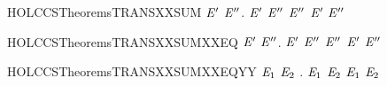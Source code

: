 \newcommand{\HOLCCSTheoremsTRANSXXstrongind}{\UseVerbatim{HOLCCSTheoremsTRANSXXstrongind}}
\begin{SaveVerbatim}{HOLCCSTheoremsTRANSXXSUM}
\HOLTokenTurnstile{} \HOLSymConst{\HOLTokenForall{}} \ensuremath{\HOLBoundVar{E}\sp{\prime}}  \ensuremath{\HOLBoundVar{E}\sp{\prime\prime}}.  \HOLSymConst{\ensuremath{+}} \ensuremath{\HOLBoundVar{E}\sp{\prime}} \HOLTokenTransBegin{}\HOLTokenTransEnd \ensuremath{\HOLBoundVar{E}\sp{\prime\prime}} \HOLSymConst{\HOLTokenImp{}}  \HOLTokenTransBegin{}\HOLTokenTransEnd \ensuremath{\HOLBoundVar{E}\sp{\prime\prime}} \HOLSymConst{\HOLTokenDisj{}} \ensuremath{\HOLBoundVar{E}\sp{\prime}} \HOLTokenTransBegin{}\HOLTokenTransEnd \ensuremath{\HOLBoundVar{E}\sp{\prime\prime}}
\end{SaveVerbatim}
\newcommand{\HOLCCSTheoremsTRANSXXSUM}{\UseVerbatim{HOLCCSTheoremsTRANSXXSUM}}
\begin{SaveVerbatim}{HOLCCSTheoremsTRANSXXSUMXXEQ}
\HOLTokenTurnstile{} \HOLSymConst{\HOLTokenForall{}} \ensuremath{\HOLBoundVar{E}\sp{\prime}}  \ensuremath{\HOLBoundVar{E}\sp{\prime\prime}}.  \HOLSymConst{\ensuremath{+}} \ensuremath{\HOLBoundVar{E}\sp{\prime}} \HOLTokenTransBegin{}\HOLTokenTransEnd \ensuremath{\HOLBoundVar{E}\sp{\prime\prime}} \HOLSymConst{\HOLTokenEquiv{}}  \HOLTokenTransBegin{}\HOLTokenTransEnd \ensuremath{\HOLBoundVar{E}\sp{\prime\prime}} \HOLSymConst{\HOLTokenDisj{}} \ensuremath{\HOLBoundVar{E}\sp{\prime}} \HOLTokenTransBegin{}\HOLTokenTransEnd \ensuremath{\HOLBoundVar{E}\sp{\prime\prime}}
\end{SaveVerbatim}
\newcommand{\HOLCCSTheoremsTRANSXXSUMXXEQ}{\UseVerbatim{HOLCCSTheoremsTRANSXXSUMXXEQ}}
\begin{SaveVerbatim}{HOLCCSTheoremsTRANSXXSUMXXEQYY}
\HOLTokenTurnstile{} \HOLSymConst{\HOLTokenForall{}}\ensuremath{\HOLBoundVar{E}\sb{\mathrm{1}}} \ensuremath{\HOLBoundVar{E}\sb{\mathrm{2}}}  . \ensuremath{\HOLBoundVar{E}\sb{\mathrm{1}}} \HOLSymConst{\ensuremath{+}} \ensuremath{\HOLBoundVar{E}\sb{\mathrm{2}}} \HOLTokenTransBegin{}\HOLTokenTransEnd {} \HOLSymConst{\HOLTokenEquiv{}} \ensuremath{\HOLBoundVar{E}\sb{\mathrm{1}}} \HOLTokenTransBegin{}\HOLTokenTransEnd {} \HOLSymConst{\HOLTokenDisj{}} \ensuremath{\HOLBoundVar{E}\sb{\mathrm{2}}} \HOLTokenTransBegin{}\HOLTokenTransEnd {}
\end{SaveVerbatim}
